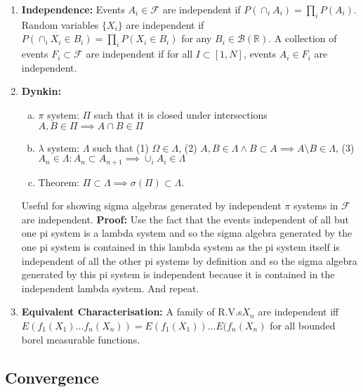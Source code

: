 \documentclass{article}
\begin{document}
\begin{enumerate}
    \item \textbf{Independence:} Events \(A_i \in \mathcal{F}\) are independent if \(P(\cap_iA_i) = \prod_i P(A_i)\). Random variables \(\{X_i\}\) are independent if \(P(\cap_i X_i \in B_i) = \prod_iP(X_i \in B_i)\) for any \(B_i \in \mathcal{B}(\mathbb{R}).\) A collection of events \(F_i \subset \mathcal{F} \) are independent if for all \(I\subset [1,N]\), events \(A_i \in F_i\) are independent.
    \item \textbf{Dynkin:} 
    \begin{enumerate} [a.]
        \item \(\pi\) system: \(\Pi\) such that it is closed under intersections \(A, B \in \Pi \implies A\cap B \in \Pi\)
        \item \(\lambda\) system: \(\Lambda\) such that (1) \(\Omega \in \Lambda\), (2) \(A, B \in \Lambda \wedge B \subset A \implies A \setminus B \in \Lambda\), (3) \(A_n \in \Lambda:A_n \subset A_{n+1} \implies \cup_iA_i \in \Lambda\)
        \item Theorem: \(\Pi \subset \Lambda \implies \sigma(\Pi) \subset \Lambda\).
    \end{enumerate}
    Useful for showing sigma algebras generated by independent \(\pi\) systems in \(\mathcal{F}\) are independent. \textbf{Proof:} Use the fact that the events independent of all but one pi system is a lambda system and so the sigma algebra generated by the one pi system is contained in this lambda system as the pi system itself is independent of all the other pi systems by definition and so the sigma algebra generated by this pi system is independent because it is contained in the independent lambda system. And repeat.
    \item \textbf{Equivalent Characterisation:} A family of R.V.s\(X_n\) are independent iff \(E(f_1(X_1)\dots f_n(X_n)) = E(f_1(X_1))\dots E(f_n(X_n)\) for all bounded borel measurable functions.
\end{enumerate}

\subsection*{Convergence}
\end{document}
